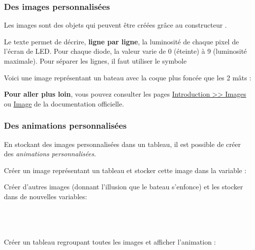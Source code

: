 \subsubsection{Des images personnalisées}

Les images sont des objets qui peuvent être créées grâce au constructeur .\par
Le texte  permet de décrire, \textbf{ligne par ligne}, la luminosité de chaque pixel de l'écran de LED. Pour chaque diode, la valeur varie de 0 (éteinte) à 9 (luminosité maximale). Pour séparer les lignes, il faut utiliser le symbole 

\begin{methode}
Voici une image représentant un bateau avec la coque plus foncée que les 2 mâts :
\end{methode}

\begin{remarque}
\textbf{Pour aller plus loin}, vous pouvez consulter les pages  \href{https://microbit-micropython.readthedocs.io/fr/latest/tutorials/images.html}{Introduction >> Images} ou \href{https://microbit-micropython.readthedocs.io/fr/latest/image.html}{Image} de la documentation officielle.
\end{remarque}


\subsubsection{Des animations personnalisées}

En stockant des images personnalisées dans un tableau, il est possible de créer des \emph{animations personnalisées}.

\begin{methode}
Créer un image représentant un tableau et stocker cette image dans la variable  :

Créer d'autres images (donnant l'illusion que le bateau s'enfonce) et les stocker dans de nouvelles variables:
\\
\\
\\
\\

Créer un tableau regroupant toutes les images et afficher l'animation :
\end{methode}

